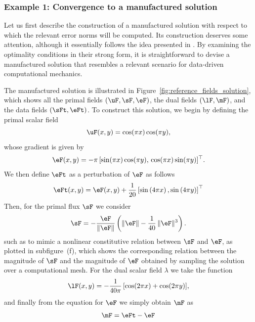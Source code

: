 \subsubsection{Example 1: Convergence to a manufactured solution}

Let us first describe the construction of a manufactured solution with respect to which the relevant error norms will be computed. Its construction deserves some attention, although it essentially follows the idea presented in \cite{ddcm1_article_gus}. By examining the optimality conditions in their strong form, it is straightforward to devise a manufactured solution that resembles a relevant scenario for data-driven computational mechanics.

The manufactured solution is illustrated in Figure~\ref{fig:reference_fields_solution}, which
shows all the primal fields $(\uF, \sF, \eF)$, the dual fields $(\lF,\mF)$, and the data fields
$(\sFt,\eFt)$. To construct this solution, we begin by defining the primal scalar field
\begin{equation}
 \uF(x,y) = \cos(\pi x)\cos(\pi y),
\end{equation}
whose gradient is given by
\begin{equation}
	\eF(x,y) = -\pi \,[\sin(\pi x)\cos(\pi y),\, \cos(\pi x)\sin(\pi y)]^{\top}.
\end{equation}
We then define $\eFt$ as a perturbation of $\eF$ as follows
\begin{equation}
\eFt(x,y) = \eF(x,y) + \frac{1}{20} \left[\sin\left(4\pi x \right), \sin\left(4 \pi y \right) \right]^{\top}
\end{equation}
Then, for the primal flux $\sF$ we consider 
\begin{equation}\label{eq:nonlinear_fluxlaw}
	\sF = -\frac{\eF}{\|\eF\|}\left(\|\eF\| - \frac{1}{40}\,\|\eF\|^{3}\right).
\end{equation}
such as to mimic a nonlinear constitutive relation between $\sF$ and $\eF$, as plotted in subfigure~(f), which shows the corresponding relation between the magnitude of $\sF$ and the magnitude of $\eF$ obtained by sampling the solution over a computational mesh.
For the dual scalar field $\lambda$ we take the function
\begin{equation}
	\lF(x,y) = -\frac{1}{40\pi}\,[\cos(2\pi x) + \cos(2\pi y)],
\end{equation}
and finally from the equation for $\eF$ we simply obtain $\mF$ as
\begin{equation}\label{eq:formu}
\mF = \eFt - \eF
\end{equation}
